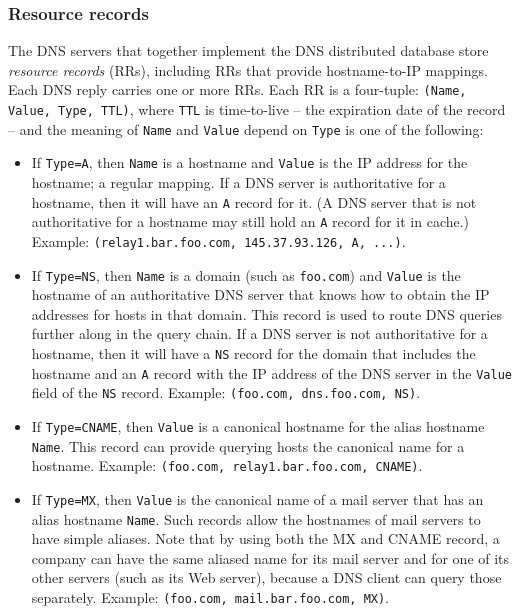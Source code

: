 \documentclass[8pt, table, xcdraw]{article}%
\begin{document}
\subsubsection{Resource records} \label{dns:rr}

The DNS servers that together implement the DNS distributed database store \emph{resource records} (RRs), including RRs that provide hostname-to-IP mappings. Each DNS reply carries one or more RRs. Each RR is a four-tuple: \texttt{(Name, Value, Type, TTL)}, where \texttt{TTL} is time-to-live -- the expiration date of the record -- and the meaning of \texttt{Name} and \texttt{Value} depend on \texttt{Type} is one of the following:

\begin{itemize}
    \item If \texttt{Type=A}, then \texttt{Name} is a hostname and \texttt{Value} is the IP address for the hostname; a regular mapping. If a DNS server is authoritative for a hostname, then it will have an \texttt{A} record for it. (A DNS server that is not authoritative for a hostname may still hold an \texttt{A} record for it in cache.) Example: \texttt{(relay1.bar.foo.com, 145.37.93.126, A, ...)}.
    \item If \texttt{Type=NS}, then \texttt{Name} is a domain (such as \texttt{foo.com}) and \texttt{Value} is the hostname of an authoritative DNS server that knows how to obtain the IP addresses for hosts in that domain. This record is used to route DNS queries further along in the query chain. If a DNS server is not authoritative for a hostname, then it will have a \texttt{NS} record for the domain that includes the hostname and an \texttt{A} record with the IP address of the DNS server in the \texttt{Value} field of the \texttt{NS} record. Example: \texttt{(foo.com, dns.foo.com, NS)}.
    \item If \texttt{Type=CNAME}, then \texttt{Value} is a canonical hostname for the alias hostname \texttt{Name}. This record can provide querying hosts the canonical name for a hostname. Example: \texttt{(foo.com, relay1.bar.foo.com, CNAME)}.
    \item If \texttt{Type=MX}, then \texttt{Value} is the canonical name of a mail server that has an alias hostname \texttt{Name}. Such records allow the hostnames of mail servers to have simple aliases. Note that by using both the MX and CNAME record, a company can have the same aliased name for its mail server and for one of its other servers (such as its Web server), because a DNS client can query those separately. Example: \texttt{(foo.com, mail.bar.foo.com, MX)}.
\end{itemize}
\end{document}
